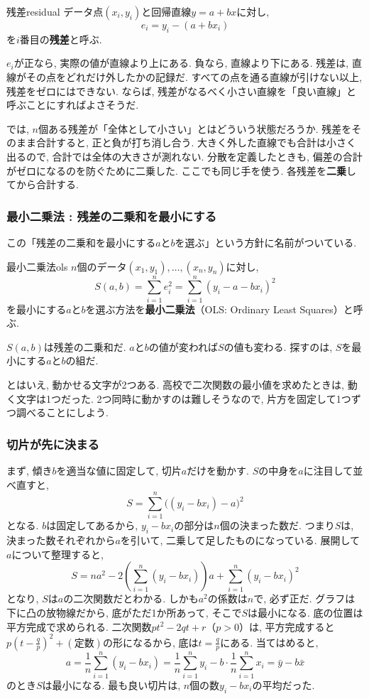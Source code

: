 \begin{defi}{残差}{residual}
データ点$(x_i, y_i)$と回帰直線$y = a + bx$に対し,
\[
  e_i = y_i - (a + bx_i)
\]
を$i$番目の\textbf{残差}と呼ぶ.
\end{defi}

$e_i$が正なら, 実際の値が直線より上にある.
負なら, 直線より下にある.
残差は, 直線がその点をどれだけ外したかの記録だ.
すべての点を通る直線が引けない以上, 残差をゼロにはできない.
ならば, 残差がなるべく小さい直線を「良い直線」と呼ぶことにすればよさそうだ.

では, $n$個ある残差が「全体として小さい」とはどういう状態だろうか.
残差をそのまま合計すると, 正と負が打ち消し合う.
大きく外した直線でも合計は小さく出るので, 合計では全体の大きさが測れない.
分散を定義したときも, 偏差の合計がゼロになるのを防ぐために二乗した.
ここでも同じ手を使う.
各残差を\textbf{二乗}してから合計する.

\subsubsection*{最小二乗法 : 残差の二乗和を最小にする}

この「残差の二乗和を最小にする$a$と$b$を選ぶ」という方針に名前がついている.

\begin{defi}{最小二乗法}{ols}
$n$個のデータ$(x_1, y_1), \ldots, (x_n, y_n)$に対し,
\[
  S(a, b) = \sum_{i=1}^{n} e_i^2 = \sum_{i=1}^{n} (y_i - a - bx_i)^2
\]
を最小にする$a$と$b$を選ぶ方法を\textbf{最小二乗法}（OLS: Ordinary Least Squares）と呼ぶ.
\end{defi}

$S(a, b)$は残差の二乗和だ.
$a$と$b$の値が変われば$S$の値も変わる.
探すのは, $S$を最小にする$a$と$b$の組だ.

とはいえ, 動かせる文字が2つある.
高校で二次関数の最小値を求めたときは, 動く文字は1つだった.
2つ同時に動かすのは難しそうなので, 片方を固定して1つずつ調べることにしよう.

\subsubsection*{切片が先に決まる}

まず, 傾き$b$を適当な値に固定して, 切片$a$だけを動かす.
$S$の中身を$a$に注目して並べ直すと,
\[
  S = \sum_{i=1}^{n} \bigl( (y_i - bx_i) - a \bigr)^2
\]
となる.
$b$は固定してあるから, $y_i - bx_i$の部分は$n$個の決まった数だ.
つまり$S$は, 決まった数それぞれから$a$を引いて, 二乗して足したものになっている.
展開して$a$について整理すると,
\[
  S = n a^2 - 2\left(\sum_{i=1}^{n}(y_i - bx_i)\right) a + \sum_{i=1}^{n}(y_i - bx_i)^2
\]
となり, $S$は$a$の二次関数だとわかる.
しかも$a^2$の係数は$n$で, 必ず正だ.
グラフは下に凸の放物線だから, 底がただ1か所あって, そこで$S$は最小になる.
底の位置は平方完成で求められる.
二次関数$pt^2 - 2qt + r$（$p > 0$）は, 平方完成すると$p\left(t - \frac{q}{p}\right)^2 + (\mbox{定数})$の形になるから, 底は$t = \frac{q}{p}$にある.
当てはめると,
\[
  a = \frac{1}{n}\sum_{i=1}^{n}(y_i - bx_i) = \frac{1}{n}\sum_{i=1}^{n}y_i - b \cdot \frac{1}{n}\sum_{i=1}^{n}x_i = \bar{y} - b\bar{x}
\]
のとき$S$は最小になる.
最も良い切片は, $n$個の数$y_i - bx_i$の平均だった.

